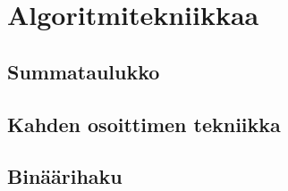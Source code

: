 \chapter{Algoritmitekniikkaa}

\section{Summataulukko}

\section{Kahden osoittimen tekniikka}

\section{Binäärihaku}
